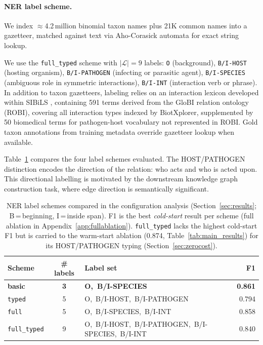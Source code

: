 \documentclass[11pt]{article}
\begin{document}
\paragraph{NER label scheme.}
We index $\approx$4.2\,million binomial taxon names plus 21K common
names into a gazetteer, matched against text via Aho-Corasick automata
\citep{aho1975efficient} for exact string lookup.

We use the \texttt{full\_typed} scheme with $|\mathcal{L}| = 9$ labels:
\texttt{O} (background), \texttt{B/I-HOST} (hosting organism),
\texttt{B/I-PATHOGEN} (infecting or parasitic agent),
\texttt{B/I-SPECIES} (ambiguous role in symmetric interactions),
\texttt{B/I-INT} (interaction verb or phrase).
In addition to taxon gazetteers, labeling relies on an interaction lexicon
developed within SIBiLS \citep{mottin2021sibils}, containing 591 terms derived
from the GloBI relation ontology (ROBI), covering all interaction types indexed
by BiotXplorer, supplemented by 50 biomedical terms for pathogen-host vocabulary
not represented in ROBI.
Gold taxon annotations from training metadata override gazetteer lookup when
available.

Table~\ref{tab:ner_schemes} compares the four label schemes evaluated.
The HOST/PATHOGEN distinction encodes the direction of the relation: who acts
and who is acted upon. This directional labelling is motivated by the downstream
knowledge graph construction task, where edge direction is semantically significant.

\begin{table}[!ht]
\centering
\small
\caption{NER label schemes compared in the configuration analysis
(Section~\ref{sec:results}; B\,=\,beginning, I\,=\,inside span).
F1 is the best \emph{cold-start} result per scheme (full ablation in
Appendix~\ref{app:fullablation}). \texttt{full\_typed} lacks the highest
cold-start F1 but is carried to the warm-start ablation (0.874,
Table~\ref{tab:main_results}) for its HOST/PATHOGEN typing (Section~\ref{sec:zerocost}).}
\label{tab:ner_schemes}
\begin{tabular}{lclr}
\toprule
\textbf{Scheme} & \textbf{\# labels} & \textbf{Label set} & \textbf{F1} \\
\midrule
\rowcolor{bestrow}
\textbf{basic}       & \textbf{3} & \textbf{O,\ B/I-SPECIES}                            & \textbf{0.861} \\
\texttt{typed}       & 5 & O,\ B/I-HOST,\ B/I-PATHOGEN                         & 0.794 \\
\texttt{full}        & 5 & O,\ B/I-SPECIES,\ B/I-INT                           & 0.858 \\
\texttt{full\_typed} & 9 & O,\ B/I-HOST,\ B/I-PATHOGEN,\ B/I-SPECIES,\ B/I-INT & 0.840 \\
\bottomrule
\end{tabular}
\end{table}
\end{document}
